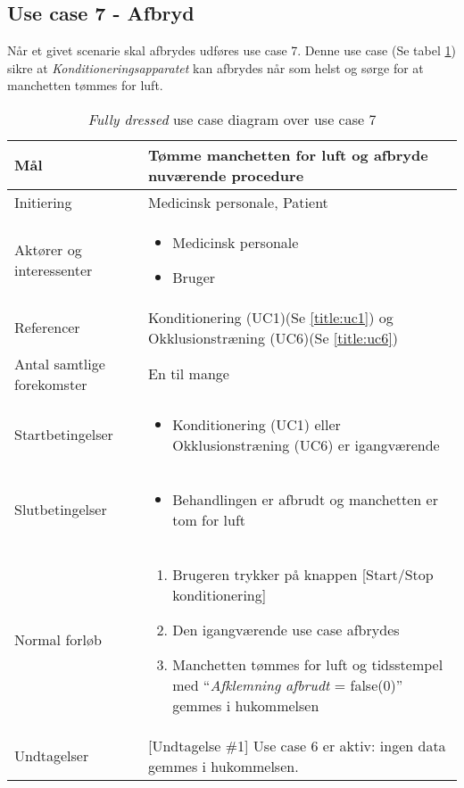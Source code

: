 	\subsection{Use case 7 - Afbryd}
	Når et givet scenarie skal afbrydes udføres use case 7. Denne use case (Se tabel \ref{tab:uc7}) sikre at \textit{Konditioneringsapparatet} kan afbrydes når som helst og sørge for at manchetten tømmes for luft. 
	\begin{table}[H]
			\begin{center}
			\begin{tabular}{ | p{} | p{}| } 
				\hline
				Mål & Tømme manchetten for luft og afbryde nuværende procedure \\ 
				\hline
				Initiering &  Medicinsk personale, Patient\\
				\hline
				Aktører og interessenter & 
				\begin{itemize}
					\item Medicinsk personale 
					\item Bruger 
				\end{itemize} \\ 
				\hline
				Referencer & Konditionering (UC1)(Se \ref{title:uc1}) og Okklusionstræning (UC6)(Se \ref{title:uc6}) \\ 
				\hline
				Antal samtlige forekomster & En til mange \\ 
				\hline	
				Startbetingelser & 
				\begin{itemize}
					\item Konditionering (UC1) eller Okklusionstræning (UC6) er igangværende				\end{itemize} \\ 
				\hline
				Slutbetingelser & 
				\begin{itemize}
					\item Behandlingen er afbrudt og manchetten er tom for luft
				\end{itemize} \\ 
				\hline
				Normal forløb & \begin{enumerate}
					\setlength\itemsep{0cm} %
					\item Brugeren trykker på knappen [Start/Stop konditionering]
					\item Den igangværende use case afbrydes
					\item Manchetten tømmes for luft og tidsstempel med “\textit{Afklemning afbrudt} = false(0)” gemmes i hukommelsen
					\subitem[Undtagelse \#1]
				\end{enumerate} \\ 
				\hline
				Undtagelser & [Undtagelse \#1] Use case 6 er aktiv: ingen data gemmes i hukommelsen. \\ 
				\hline
			\end{tabular}
		\end{center}
			\caption{\textit{Fully dressed} use case diagram over use case 7} \label{tab:uc7}
		\end{table}
	\newpage

		